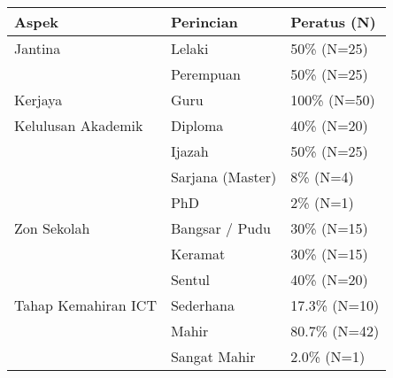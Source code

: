
\begin{table}
\centering

\begin{tabular}{| l | l | l |}
\hline
\textbf{Aspek} & \textbf{Perincian} & \textbf{Peratus (N)} \\
\hline
Jantina & Lelaki & 50\% (N=25) \\
\hline
  & Perempuan & 50\% (N=25) \\
\hline
Kerjaya & Guru & 100\% (N=50) \\
\hline
Kelulusan Akademik & Diploma & 40\% (N=20) \\
\hline
  & Ijazah & 50\% (N=25) \\
\hline
  & Sarjana (Master) & 8\% (N=4) \\
\hline
  & PhD & 2\% (N=1) \\
\hline
Zon Sekolah & Bangsar / Pudu & 30\% (N=15) \\
\hline
  & Keramat & 30\% (N=15) \\
\hline
  & Sentul & 40\% (N=20) \\
\hline
Tahap Kemahiran ICT & Sederhana & 17.3\% (N=10) \\
\hline
  & Mahir & 80.7\% (N=42) \\
\hline
  & Sangat Mahir & 2.0\% (N=1) \\
\hline

\end{tabular}

\end{table}
